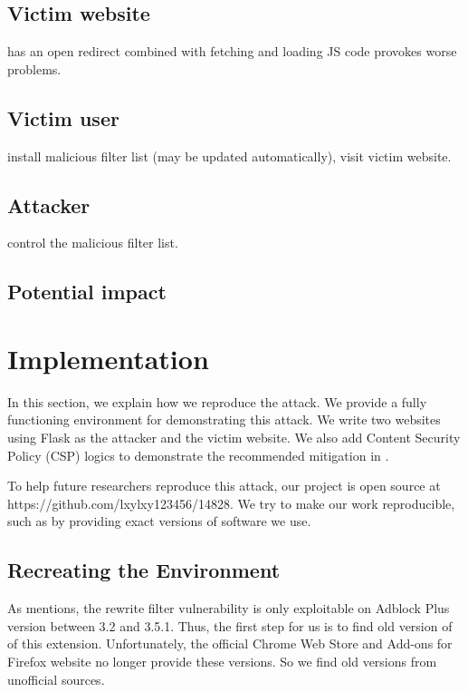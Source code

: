 \documentclass[conference]{IEEEtran}
\begin{document}
\subsection{Victim website}

has an open redirect combined with fetching and loading JS code provokes worse problems.

\subsection{Victim user}

install malicious filter list (may be updated automatically), visit victim website.

\subsection{Attacker}

control the malicious filter list.

\subsection{Potential impact}

\section{Implementation}
\label{sec:Implementation}

In this section, we explain how we reproduce the attack. We provide a fully functioning environment for demonstrating this attack. We write two websites using Flask as the attacker and the victim website. We also add Content Security Policy (CSP) logics to demonstrate the recommended mitigation in \cite{abp_code_injection}.

To help future researchers reproduce this attack, our project is open source at https://github.com/lxylxy123456/14828. We try to make our work reproducible, such as by providing exact versions of software we use.

\subsection{Recreating the Environment}

As \cite{abp_code_injection} mentions, the rewrite filter vulnerability is only exploitable on Adblock Plus version between 3.2 and 3.5.1. Thus, the first step for us is to find old version of of this extension. Unfortunately, the official Chrome Web Store and Add-ons for Firefox website no longer provide these versions. So we find old versions from unofficial sources.
\end{document}
